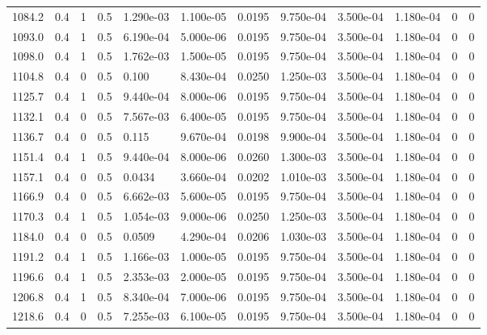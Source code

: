 \documentclass[preview]{standalone}
\begin{document}
{{{\begin{tabular}{L{1.2cm}C{1.2cm} C{0.3cm}C{0.5cm} C{1.4cm}C{1.4cm} C{1.4cm}C{1.4cm} C{1.6cm}C{1.6cm} C{1.6cm}C{1.6cm}}
  1084.2  &   0.4  & 1     & 0.5 &  1.290e-03  & 1.100e-05  &  0.0195&   9.750e-04& 3.500e-04 & 1.180e-04   &  0 & 0  \\ 
  1093.0  &   0.4  & 1     & 0.5 &  6.190e-04  & 5.000e-06  &  0.0195&   9.750e-04& 3.500e-04 & 1.180e-04   &  0 & 0  \\ 
  1098.0  &   0.4  & 1     & 0.5 &  1.762e-03  & 1.500e-05  &  0.0195&   9.750e-04& 3.500e-04 & 1.180e-04   &  0 & 0  \\ 
  1104.8  &   0.4  & 0     & 0.5 &  0.100  & 8.430e-04  &  0.0250&   1.250e-03& 3.500e-04 & 1.180e-04   &  0 & 0  \\ 
  1125.7  &   0.4  & 1     & 0.5 &  9.440e-04  & 8.000e-06  &  0.0195&   9.750e-04& 3.500e-04 & 1.180e-04   &  0 & 0  \\ 
  1132.1  &   0.4  & 0     & 0.5 &  7.567e-03  & 6.400e-05  &  0.0195&   9.750e-04& 3.500e-04 & 1.180e-04   &  0 & 0  \\ 
  1136.7  &   0.4  & 0     & 0.5 &  0.115  & 9.670e-04  &  0.0198&   9.900e-04& 3.500e-04 & 1.180e-04   &  0 & 0  \\ 
  1151.4  &   0.4  & 1     & 0.5 &  9.440e-04  & 8.000e-06  &  0.0260&   1.300e-03& 3.500e-04 & 1.180e-04   &  0 & 0  \\ 
  1157.1  &   0.4  & 0     & 0.5 &  0.0434  & 3.660e-04  &  0.0202&   1.010e-03& 3.500e-04 & 1.180e-04   &  0 & 0  \\ 
  1166.9  &   0.4  & 0     & 0.5 &  6.662e-03  & 5.600e-05  &  0.0195&   9.750e-04& 3.500e-04 & 1.180e-04   &  0 & 0  \\ 
  1170.3  &   0.4  & 1     & 0.5 &  1.054e-03  & 9.000e-06  &  0.0250&   1.250e-03& 3.500e-04 & 1.180e-04   &  0 & 0  \\ 
  1184.0  &   0.4  & 0     & 0.5 &  0.0509  & 4.290e-04  &  0.0206&   1.030e-03& 3.500e-04 & 1.180e-04   &  0 & 0  \\ 
  1191.2  &   0.4  & 1     & 0.5 &  1.166e-03  & 1.000e-05  &  0.0195&   9.750e-04& 3.500e-04 & 1.180e-04   &  0 & 0  \\ 
  1196.6  &   0.4  & 1     & 0.5 &  2.353e-03  & 2.000e-05  &  0.0195&   9.750e-04& 3.500e-04 & 1.180e-04   &  0 & 0  \\ 
  1206.8  &   0.4  & 1     & 0.5 &  8.340e-04  & 7.000e-06  &  0.0195&   9.750e-04& 3.500e-04 & 1.180e-04   &  0 & 0  \\ 
  1218.6  &   0.4  & 0     & 0.5 &  7.255e-03  & 6.100e-05  &  0.0195&   9.750e-04& 3.500e-04 & 1.180e-04   &  0 & 0  \\ 
\hline 
\end{tabular} 

}}}
\end{document}
